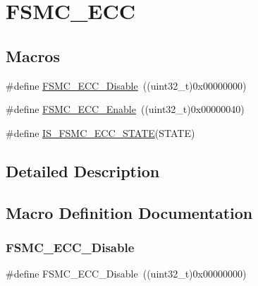 \hypertarget{group___f_s_m_c___e_c_c}{}\section{F\+S\+M\+C\+\_\+\+E\+CC}
\label{group___f_s_m_c___e_c_c}
\subsection*{Macros}
\begin{DoxyCompactItemize}
\item 
\#define \mbox{\hyperlink{group___f_s_m_c___e_c_c_ga9a3264c0718f5023fd106abea7ef806d}{F\+S\+M\+C\+\_\+\+E\+C\+C\+\_\+\+Disable}}~((uint32\+\_\+t)0x00000000)
\item 
\#define \mbox{\hyperlink{group___f_s_m_c___e_c_c_ga9d940243830695412d4c98228bb5b763}{F\+S\+M\+C\+\_\+\+E\+C\+C\+\_\+\+Enable}}~((uint32\+\_\+t)0x00000040)
\item 
\#define \mbox{\hyperlink{group___f_s_m_c___e_c_c_gaf1a7cb45edd8707bf4ea8aac96799c77}{I\+S\+\_\+\+F\+S\+M\+C\+\_\+\+E\+C\+C\+\_\+\+S\+T\+A\+TE}}(S\+T\+A\+TE)
\end{DoxyCompactItemize}


\subsection{Detailed Description}


\subsection{Macro Definition Documentation}
\mbox{\label{group___f_s_m_c___e_c_c_ga9a3264c0718f5023fd106abea7ef806d}} 
\subsubsection{\texorpdfstring{FSMC\_ECC\_Disable}{FSMC\_ECC\_Disable}}
{\footnotesize\ttfamily \#define F\+S\+M\+C\+\_\+\+E\+C\+C\+\_\+\+Disable~((uint32\+\_\+t)0x00000000)}

\mbox{\label{group___f_s_m_c___e_c_c_ga9d940243830695412d4c98228bb5b763}} 
